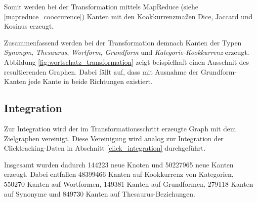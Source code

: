 Somit werden bei der Transformation mittels MapReduce (siehe \ref{mapreduce_cooccurence}) Kanten mit den Kookkurrenzmaßen Dice, Jaccard und Kosinus erzeugt.

Zusammenfassend werden bei der Transformation demnach Kanten der Typen \emph{Synonym}, \emph{Thesaurus}, \emph{Wortform}, \emph{Grundform} und \emph{Kategorie-Kookkurrenz} erzeugt. Abbildung \ref{fig:wortschatz_transformation} zeigt beispielhaft einen Ausschnit des resultierenden Graphen. Dabei fällt auf, dass mit Ausnahme der Grundform-Kanten jede Kante in beide Richtungen existiert.

\subsection{Integration}

Zur Integration wird der im Transformationsschritt erzeugte Graph mit dem Zielgraphen vereinigt. Diese Vereinigung wird analog zur Integration der Clicktracking-Daten in Abschnitt \ref{click_integration} durchgeführt.

Insgesamt wurden dadurch \num{144223} neue Knoten und \num{50227965} neue Kanten erzeugt.  Dabei entfallen \num{48399466} Kanten auf Kookkurrenz von Kategorien, \num{550270} Kanten auf Wortformen, \num{149381} Kanten auf Grundformen, \num{279118} Kanten auf Synonyme und \num{849730} Kanten auf Thesaurus-Beziehungen.